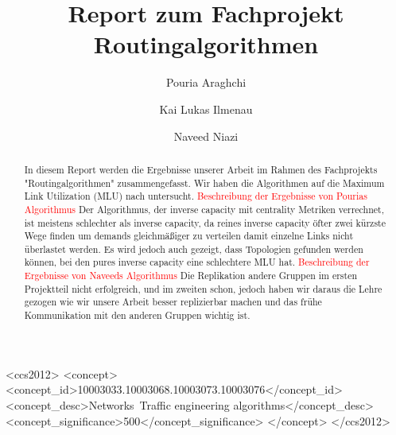 \documentclass[sigconf, nonacm, review]{acmart}
\begin{document}
\title{Report zum Fachprojekt Routingalgorithmen}
\author{Pouria Araghchi}

\author{Kai Lukas Ilmenau}

\author{Naveed Niazi}

\renewcommand{\shortauthors}{Araghchi, Ilmenau, Niazi}

\begin{abstract}
In diesem Report werden die Ergebnisse unserer Arbeit im Rahmen des Fachprojekts "Routingalgorithmen" zusammengefasst.
Wir haben die Algorithmen auf die Maximum Link Utilization (MLU) nach \cite{foerster2021} untersucht.
\textcolor{red}{Beschreibung der Ergebnisse von Pourias Algorithmus}
Der Algorithmus, der inverse capacity mit centrality Metriken verrechnet, ist meistens schlechter als inverse capacity, 
da reines inverse capacity öfter zwei kürzste Wege finden um demands gleichmäßiger zu verteilen damit einzelne Links nicht überlastet werden.
Es wird jedoch auch gezeigt, dass Topologien gefunden werden können, bei den pures inverse capacity eine schlechtere MLU hat.
\textcolor{red}{Beschreibung der Ergebnisse von Naveeds Algorithmus}
Die Replikation andere Gruppen im ersten Projektteil nicht erfolgreich, und im zweiten schon, 
jedoch haben wir daraus die Lehre gezogen wie wir unsere Arbeit besser replizierbar machen und das frühe Kommunikation mit den anderen Gruppen wichtig ist.
\end{abstract}

\begin{CCSXML}
<ccs2012>
<concept>
<concept_id>10003033.10003068.10003073.10003076</concept_id>
<concept_desc>Networks~Traffic engineering algorithms</concept_desc>
<concept_significance>500</concept_significance>
</concept>
</ccs2012>
\end{CCSXML}

\end{document}
